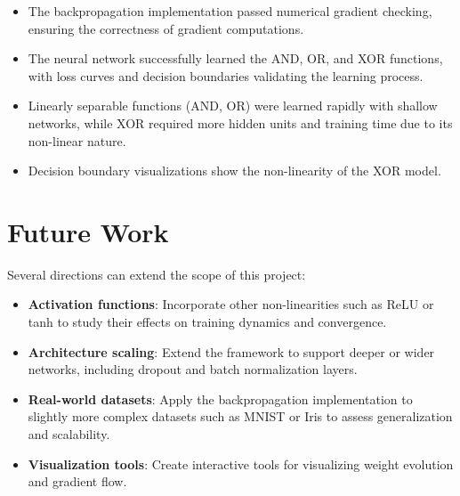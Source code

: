 \documentclass[11pt,a4paper]{article}
\begin{document}
\begin{itemize}
\item The backpropagation implementation passed numerical gradient checking, ensuring the correctness of gradient computations.
\item The neural network successfully learned the AND, OR, and XOR functions, with loss curves and decision boundaries validating the learning process.
\item Linearly separable functions (AND, OR) were learned rapidly with shallow networks, while XOR required more hidden units and training time due to its non-linear nature.
\item Decision boundary visualizations show the non-linearity of the XOR model.
\end{itemize}

\section{Future Work}
\label{sec:future}
Several directions can extend the scope of this project:

\begin{itemize}
\item \textbf{Activation functions}: Incorporate other non-linearities such as ReLU or tanh to study their effects on training dynamics and convergence.
\item \textbf{Architecture scaling}: Extend the framework to support deeper or wider networks, including dropout and batch normalization layers.
\item \textbf{Real-world datasets}: Apply the backpropagation implementation to slightly more complex datasets such as MNIST or Iris to assess generalization and scalability.
\item \textbf{Visualization tools}: Create interactive tools for visualizing weight evolution and gradient flow.
\end{itemize}



\end{document}

